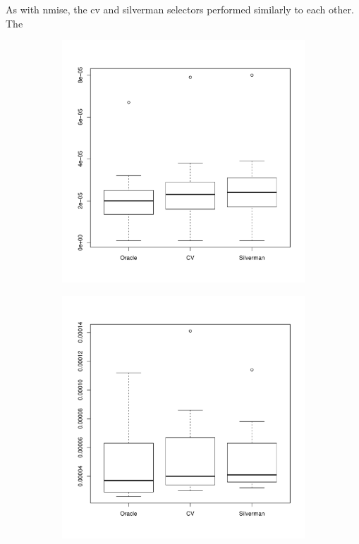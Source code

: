 As with \gls{nmise}, the \gls{cv} and \gls{silverman} selectors performed similarly to each other.
The 
\begin{figure}[htbp]
    \centering
    \begin{subfigure}[t]{0.45\textwidth}
        \includegraphics[width=\textwidth]{results/by_overall/normalized-miae-boxplot}
        \label{fig:discussion:overall_nmiae_boxplot:unif}
    \end{subfigure}
    \begin{subfigure}[t]{0.45\textwidth}
        \includegraphics[width=\textwidth]{results/by_overall/normalized-miae-peakpop-boxplot}

\end{subfigure}
\end{figure}
